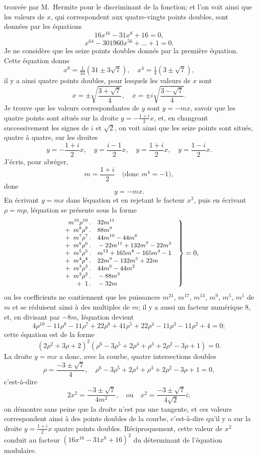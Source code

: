 \documentclass[11pt,a4paper]{article}
\theoremstyle{plain}
\begin{document}
trouv\'ee par M.\ Hermite pour le discriminant de la fonction; et l'on voit ainsi que les valeurs de $x$, qui correspondent aux quatre-vingts points doubles, sont donn\'ees par les \'equations
$$
16x^{16} - 31x^8 + 16 = 0,
$$
$$
x^{64} - 301960x^{56} + \ldots + 1 = 0.
$$
Je ne consid\`ere que les seize points doubles donn\'es par la premi\`ere \'equation. Cette \'equation donne
$$
x^8 = \tfrac{1}{32}(31 \pm 3\sqrt{7}), \quad x^4 = \tfrac{1}{4}(3 \pm \sqrt{7}),
$$
il y a ainsi quatre points doubles, pour lesquels les valeurs de $x$ sont
$$
x = \pm\sqrt{\frac{3 + \sqrt{7}}{4}}, \quad x = \pm i\sqrt{\frac{3 - \sqrt{7}}{4}}.
$$
Je trouve que les valeurs correspondantes de $y$ sont $y = -mx$, savoir que les quatre points sont situ\'es sur la droite $y = -\frac{1+i}{2}x$, et, en changeant successivement les signes de $i$ et $\sqrt{2}$, on voit ainsi que les seize points sont situ\'es, quatre \`a quatre, sur les droites
$$
y = -\frac{1+i}{2}x, \quad y = \frac{i-1}{2}x, \quad y = \frac{1+i}{2}x, \quad y = \frac{1-i}{2}x.
$$
J'\'ecris, pour abr\'eger,
$$
m = \frac{1+i}{2} \quad \text{(donc } m^4 = -1 \text{)},
$$
done
$$
y = -mx.
$$
En \'ecrivant $y = mx$ dans l\'equation et en rejetant le facteur $x^2$, puis en \'ecrivant $\rho = mp$, l\'equation se pr\'esente sous la forme
$$\small
\left.\begin{array}{r@{\,}l@{\quad}r}
m^{10}\rho^{10} & .\quad 32m^{11} \\
{}+\; m^{8}\rho^{8} & .\quad 88m^{9} \\
{}+\; m^{7}\rho^{7} & .\quad 44m^{10} - 44m^{6} \\
{}+\; m^{6}\rho^{6} & .\quad -22m^{11} + 132m^{7} - 22m^{3} \\
{}+\; m^{5}\rho^{5} & .\quad m^{12} + 165m^{8} - 165m^{4} - 1 \\
{}+\; m^{4}\rho^{4} & .\quad 22m^{9} - 132m^{5} + 22m \\
{}+\; m^{3}\rho^{3} & .\quad 44m^{6} - 44m^{2} \\
{}+\; m^{2}\rho^{2} & .\quad -88m^{3} \\
{}+\; 1 & .\quad -32m
\end{array}\right\} = 0,
$$
ou les coefficients ne contiennent que les puissances $m^{21}$, $m^{17}$, $m^{13}$, $m^9$, $m^5$, $m^1$ de $m$ et se r\'eduisent ainsi \`a des multiples de $m$; il y a aussi un facteur num\'erique 8, et, en divisant par $-8m$, l\'equation devient
$$4\rho^{10} - 11\rho^8 - 11\rho^7 + 22\rho^6 + 41\rho^5 + 22\rho^4 - 11\rho^3 - 11\rho^2 + 4 = 0;$$
cette \'equation est de la forme
$$
(2\rho^2 + 3\rho + 2)^2(\rho^6 - 3\rho^5 + 2\rho^4 + \rho^3 + 2\rho^2 - 3\rho + 1) = 0.
$$
La droite $y = mx$ a donc, avec la courbe, quatre intersections doubles
$$
\rho = \frac{-3 \pm \sqrt{7}}{4}, \quad \rho^6 - 3\rho^5 + 2\rho^4 + \rho^3 + 2\rho^2 - 3\rho + 1 = 0,
$$
c'est-\`a-dire
$$
2x^2 = \frac{-3 \pm \sqrt{7}}{4m^2}, \quad \text{ou} \quad x^2 = \frac{-3 \pm \sqrt{7}}{4\sqrt{2}}i;
$$
on d\'emontre sans peine que la droite n'est pas une tangente, et ces valeurs correspondent ainsi \`a des points doubles de la courbe, c'est-\`a-dire qu'il y a sur la droite $y = \frac{1+i}{2}x$ quatre points doubles. R\'eciproquement, cette valeur de $x^2$ conduit au facteur $(16x^{16} - 31x^8 + 16)^2$ du d\'eterminant de l'\'equation modulaire.
\end{document}
